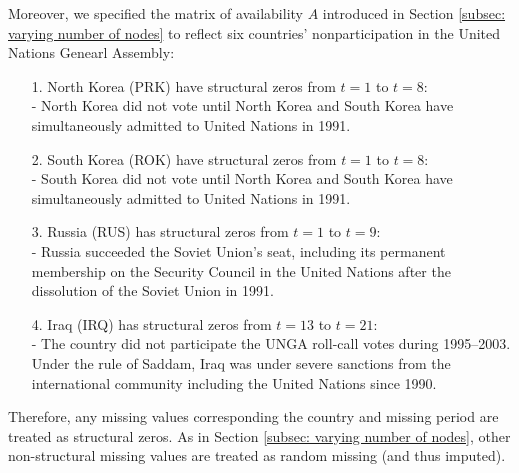 \documentclass[a4paper]{article}
\begin{document}
Moreover, we specified the matrix of availability $A$ introduced in Section \ref{subsec: varying number of nodes} to reflect six countries' nonparticipation in the United Nations Genearl Assembly: 
\begin{itemize}
	\item[1.]  North Korea (PRK) have structural zeros from $t = 1$ to $t = 8$:\\
	- North Korea did not vote until North Korea and South Korea have simultaneously admitted to United Nations in 1991.
	\item[2.] South Korea (ROK) have structural zeros from $t = 1$ to $t = 8$:\\
	- South Korea did not vote until North Korea and South Korea have simultaneously admitted to United Nations in 1991.
	\item [3.] Russia (RUS) has structural zeros from $t=1$ to $t =9$:\\
- Russia succeeded the Soviet Union's seat, including its permanent membership on the Security Council in the United Nations after the dissolution of the Soviet Union in 1991. 
	\item [4.] Iraq (IRQ) has structural zeros from $t =13$ to $t = 21$:\\
	- The country did not participate the UNGA roll-call votes during 1995--2003. Under the rule of Saddam, Iraq was under severe sanctions from the international community including the United Nations since 1990.
\end{itemize}
Therefore, any missing values corresponding the country and missing period are treated as structural zeros. As in Section \ref{subsec: varying number of nodes}, other non-structural missing values are treated as random missing (and thus imputed). 
\end{document}
